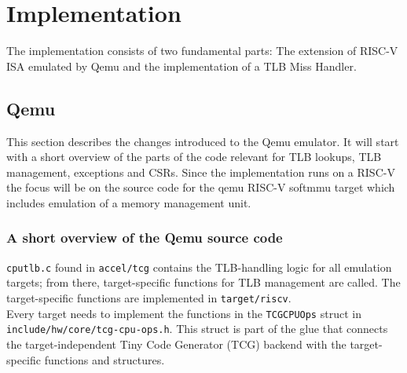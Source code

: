 \chapter{Implementation}

\label{chap:impl}
The implementation consists of two fundamental parts:
The extension of RISC-V ISA emulated by Qemu and the implementation of a
TLB Miss Handler.



\section{Qemu}
This section describes the changes introduced to the Qemu emulator.
It will start with a short overview of the parts of the code relevant for TLB lookups,
TLB management, exceptions and CSRs. Since the implementation runs on a RISC-V
the focus will be on the source code for the qemu RISC-V softmmu target which includes
emulation of a memory management unit.


\subsection{A short overview of the Qemu source code}
\texttt{cputlb.c} found in \texttt{accel/tcg} contains the TLB-handling logic for all
emulation targets; from there, target-specific functions for TLB management are called.
The target-specific functions are implemented in \texttt{target/riscv}.\\
Every target needs to implement the functions in the \texttt{TCGCPUOps} struct in
\texttt{include/hw/core/tcg-cpu-ops.h}. This struct is part of the glue that connects the target-independent
Tiny Code Generator (TCG) backend with the target-specific functions and structures.


